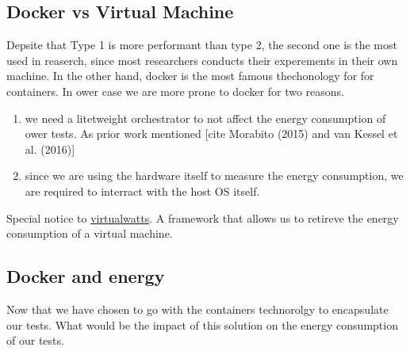 \subsection{Docker vs Virtual Machine}
Depsite that Type 1 is more performant than type 2, the second one is the most used in reaserch, since most researchers conducts their experements in their own machine. In the other hand, docker is the most famous thechonology for for containers.
In ower case we are more prone to docker for two reasons.
\begin{enumerate}
    \item we need a litetweight orchestrator to not affect the energy consumption of ower tests. As prior work mentioned [cite Morabito (2015) and van Kessel et al. (2016)]
    \item since we are using the hardware itself to measure the energy consumption, we are required to interract with the host OS itself.
\end{enumerate}
Special notice to \href{https://github.com/powerapi-ng/virtualwatts}{virtualwatts}. A framework that allows us to retireve the energy consumption of a virtual machine.
\subsection{Docker and energy}
Now that we have chosen to go with the containers technorolgy to encapsulate our tests. What would be the impact of this solution on the energy consumption of our tests.

